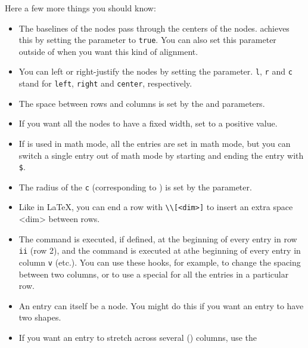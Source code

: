 \documentclass[11pt,english,BCOR10mm,DIV12,bibliography=totoc,parskip=false,smallheadings
    headexclude,footexclude,oneside]{pst-doc}
\begin{document}
Here a few more things you should know:
\begin{itemize}
 \item The baselines of the nodes pass through the centers of the
 nodes.  achieves this by setting the
parameter to \verb|true|. You can also set this parameter outside of 
when you want this kind of alignment.

 \item You can left or right-justify the nodes by setting the
parameter. \verb|l|, \verb|r| and \verb|c| stand for \verb|left|, \verb|right| and \verb|center|,
respectively.

 \item The space between rows and columns is set by the
   and 
parameters.

 \item If you want all the nodes to have a fixed width, set
to a positive value.

 \item If  is used in math mode, all the entries are set in math
 mode, but you can switch a single entry out of math mode by starting and
 ending the entry with \verb|$|. %

 \item The radius of the \verb|c|  (corresponding to ) is set by
the  parameter.

 \item Like in \LaTeX, you can end a row with \verb|\\[<dim>]| to insert an extra
 space <dim> between rows.

 \item The command  is executed, if defined, at the beginning of
 every entry in row \verb|ii| (row 2), and the command  is executed at
 athe beginning of every entry in column \verb|v| (etc.). You can use these hooks,
 for example, to change the spacing between two columns, or to use a special
  for all the entries in a particular row.

 \item An entry can itself be a node. You might do this if you want an entry
 to have two shapes.

 \item If you want an entry to stretch across several () columns, use the


\end{itemize}
\end{document}
